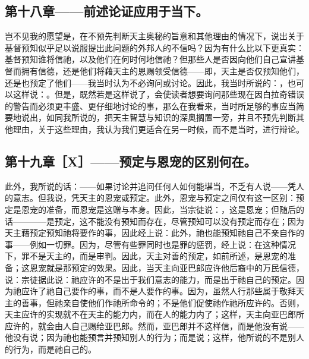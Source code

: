 
\subsection{第十八章——前述论证应用于当下。}

岂不见我的愿望是，在不预先判断天主奥秘的旨意和其他理由的情况下，说出关于基督预知似乎足以说服提出此问题的外邦人的不信吗？因为有什么比以下更真实：基督预知谁将信祂，以及他们在何时何地信祂？但那些人是否因向他们自己宣讲基督而拥有信德，还是他们将藉天主的恩赐领受信德——即，天主是否仅预知他们，还是也预定了他们——我当时认为不必询问或讨论。因此，我当时所说的：，也可以这样说：。但是，既然若是这样说了，会使读者想要询问那些现在因白拉奇错误的警告而必须更丰盛、更仔细地讨论的事，那么在我看来，当时所足够的事应当简要地说出，如同我所说的，把天主智慧与知识的深奥搁置一旁，并且不预先判断其他理由，关于这些理由，我认为我们更适合在另一时候，而不是当时，进行辩论。\par


\subsection{第十九章［X］——预定与恩宠的区别何在。}

此外，我所说的话：——如果讨论并追问任何人如何能堪当，不乏有人说——凭人的意志。但我说，凭天主的恩宠或预定。此外，恩宠与预定之间仅有这一区别：预定是恩宠的准备，而恩宠是这赠与本身。因此，当宗徒说：，这是恩宠；但随后的话————是预定，这不能没有预知而存在，尽管预知可以没有预定而存在；因为天主藉预定预知祂将要作的事，因此经上说：此外，祂也能预知祂自己不亲自作的事——例如一切罪。因为，尽管有些罪同时也是罪的惩罚，经上说：在这种情况下，罪不是天主的，而是审判。因此，天主对善的预定，如前所述，是恩宠的准备；这恩宠就是那预定的效果。因此，当天主向亚巴郎应许他后裔中的万民信德，说：宗徒据此说：祂应许的不是出于我们意志的能力，而是出于祂自己的预定。因为祂应许了祂自己要作的事，而不是人要作的事。因为，虽然人行那些属于敬拜天主的善事，但祂亲自使他们作祂所命令的；不是他们促使祂作祂所应许的。否则，天主应许的实现就不在天主的能力内，而在人的能力内了；这样，天主向亚巴郎所应许的，就会由人自己赐给亚巴郎。然而，亚巴郎并不这样信，而是他没有说——他没有说；因为祂也能预言并预知别人的行为；而是说；这样，他所说的不是别人的行为，而是祂自己的。\par

